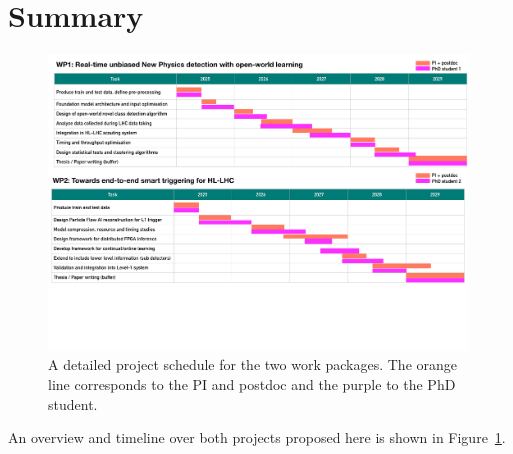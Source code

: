 \documentclass[12pt]{iopart}
\begin{document}
\section{Summary}
\begin{figure}[bht!]
    \centering
    \includegraphics[width=0.99\textwidth]{figures/GanntChart_SG.pdf}
    \caption{A detailed project schedule for the two work packages. The orange line corresponds to the PI and postdoc and the purple to the PhD student.}
    \label{fig:gannt}
\end{figure}
An overview and timeline over both projects proposed here is shown in Figure~\ref{fig:gannt}.
\end{document}
